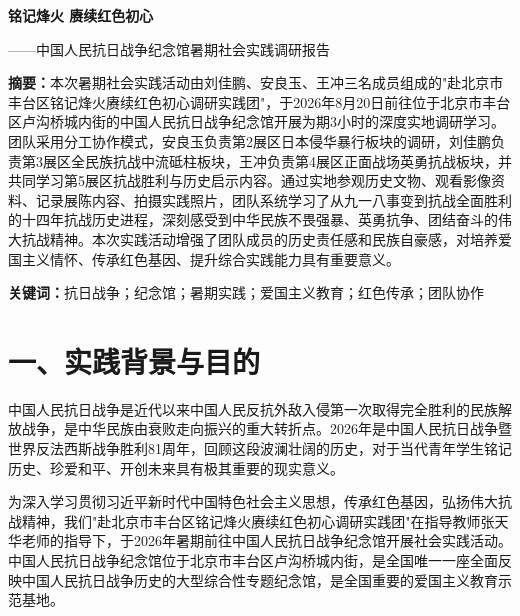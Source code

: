 \documentclass[a4paper,12pt]{article}
\begin{document}
\begin{center}
\songti{}\textbf{铭记烽火 赓续红色初心}
\end{center}
\begin{flushright}
\songti{}——中国人民抗日战争纪念馆暑期社会实践调研报告
\end{flushright}

\vspace{22pt}

\noindent\heiti{}\textbf{摘\quad\quad 要：}\songti{}\hspace{1em}本次暑期社会实践活动由刘佳鹏、安良玉、王冲三名成员组成的"赴北京市丰台区铭记烽火赓续红色初心调研实践团"，于2026年8月20日前往位于北京市丰台区卢沟桥城内街的中国人民抗日战争纪念馆开展为期3小时的深度实地调研学习。团队采用分工协作模式，安良玉负责第2展区日本侵华暴行板块的调研，刘佳鹏负责第3展区全民族抗战中流砥柱板块，王冲负责第4展区正面战场英勇抗战板块，并共同学习第5展区抗战胜利与历史启示内容。通过实地参观历史文物、观看影像资料、记录展陈内容、拍摄实践照片，团队系统学习了从九一八事变到抗战全面胜利的十四年抗战历史进程，深刻感受到中华民族不畏强暴、英勇抗争、团结奋斗的伟大抗战精神。本次实践活动增强了团队成员的历史责任感和民族自豪感，对培养爱国主义情怀、传承红色基因、提升综合实践能力具有重要意义。

\vspace{22pt}

\noindent\heiti{}\textbf{关键词：}\songti{}\hspace{1em}抗日战争；纪念馆；暑期实践；爱国主义教育；红色传承；团队协作

\vspace{22pt}

\songti{}
\setlength{\parindent}{2em}
\linespread{1.0}
\selectfont

\section*{\songti{}\textbf{一、实践背景与目的}}

中国人民抗日战争是近代以来中国人民反抗外敌入侵第一次取得完全胜利的民族解放战争，是中华民族由衰败走向振兴的重大转折点。2026年是中国人民抗日战争暨世界反法西斯战争胜利81周年，回顾这段波澜壮阔的历史，对于当代青年学生铭记历史、珍爱和平、开创未来具有极其重要的现实意义。

为深入学习贯彻习近平新时代中国特色社会主义思想，传承红色基因，弘扬伟大抗战精神，我们"赴北京市丰台区铭记烽火赓续红色初心调研实践团"在指导教师张天华老师的指导下，于2026年暑期前往中国人民抗日战争纪念馆开展社会实践活动。中国人民抗日战争纪念馆位于北京市丰台区卢沟桥城内街，是全国唯一一座全面反映中国人民抗日战争历史的大型综合性专题纪念馆，是全国重要的爱国主义教育示范基地。
\end{document}
